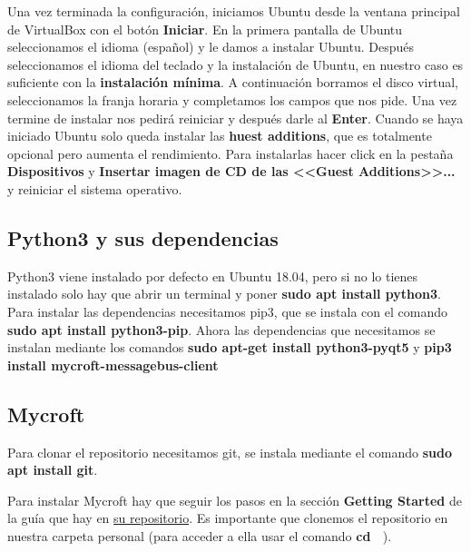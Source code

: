  

Una vez terminada la configuración, iniciamos Ubuntu desde la ventana principal de VirtualBox con el botón \textbf{Iniciar}. En la primera pantalla de Ubuntu seleccionamos el idioma (español) y le damos a instalar Ubuntu.
Después seleccionamos el idioma del teclado y la instalación de Ubuntu, en nuestro caso es suficiente con la \textbf{instalación mínima}. A continuación borramos el disco virtual, seleccionamos la franja horaria y completamos los campos que nos pide. Una vez termine de instalar nos pedirá reiniciar y después darle al \textbf{Enter}. Cuando se haya iniciado Ubuntu solo queda instalar las \textbf{huest additions}, que es totalmente opcional pero aumenta el rendimiento. Para instalarlas hacer click en la pestaña \textbf{Dispositivos} y \textbf{Insertar imagen de CD de las <<Guest Additions>>...} y reiniciar el sistema operativo.

 

\subsection{Python3 y sus dependencias}

Python3 viene instalado por defecto en Ubuntu 18.04, pero si no lo tienes instalado solo hay que abrir un terminal y poner \textbf{sudo apt install python3}. Para instalar las dependencias necesitamos pip3, que se instala con el comando \textbf{sudo apt install python3-pip}. Ahora las dependencias que necesitamos se instalan mediante los comandos \textbf{sudo apt-get install python3-pyqt5} y \textbf{pip3 install mycroft-messagebus-client}

\subsection{Mycroft}

Para clonar el repositorio necesitamos git, se instala mediante el comando \textbf{sudo apt install git}.

Para instalar Mycroft hay que seguir los pasos en la sección \textbf{Getting Started} de la guía que hay en \href{https://github.com/MycroftAI/mycroft-core}{su repositorio}. Es importante que clonemos el repositorio en nuestra carpeta personal (para acceder a ella usar el comando \textbf{cd ~}).

